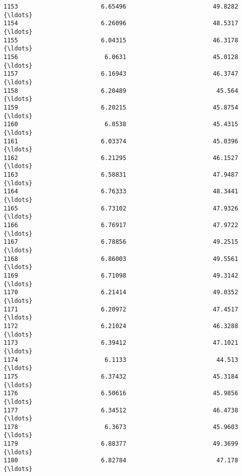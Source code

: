 \documentclass[11pt]{article}
\begin{document}
\begin{tcolorbox}[breakable, size=fbox, boxrule=.5pt, pad at break*=1mm, opacityfill=0]
\begin{Verbatim}[commandchars=\\\{\}]
1153                       6.65496                        49.8282  {\ldots}
1154                       6.26096                        48.5317  {\ldots}
1155                       6.04315                        46.3178  {\ldots}
1156                        6.0631                        45.0128  {\ldots}
1157                       6.16943                        46.3747  {\ldots}
1158                       6.20489                         45.564  {\ldots}
1159                       6.20215                        45.8754  {\ldots}
1160                        6.0538                        45.4315  {\ldots}
1161                       6.03374                        45.0396  {\ldots}
1162                       6.21295                        46.1527  {\ldots}
1163                       6.58831                        47.9487  {\ldots}
1164                       6.76333                        48.3441  {\ldots}
1165                       6.73102                        47.9326  {\ldots}
1166                       6.76917                        47.9722  {\ldots}
1167                       6.78856                        49.2515  {\ldots}
1168                       6.86003                        49.5561  {\ldots}
1169                       6.71098                        49.3142  {\ldots}
1170                       6.21414                        49.0352  {\ldots}
1171                       6.20972                        47.4517  {\ldots}
1172                       6.21024                        46.3288  {\ldots}
1173                       6.39412                        47.1021  {\ldots}
1174                        6.1133                         44.513  {\ldots}
1175                       6.37432                        45.3184  {\ldots}
1176                       6.50616                        45.9856  {\ldots}
1177                       6.34512                        46.4738  {\ldots}
1178                        6.3673                        45.9603  {\ldots}
1179                       6.88377                        49.3699  {\ldots}
1180                       6.82784                         47.178  {\ldots}


\end{Verbatim}
\end{tcolorbox}
\end{document}
